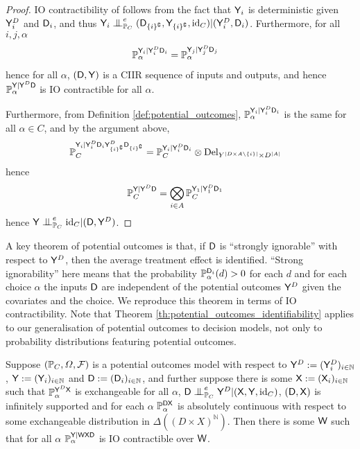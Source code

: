 \begin{proof}
IO contractibility of  follows from the fact that $\mathsf{Y}_i$ is deterministic given $\mathsf{Y}^D_i$ and $\mathsf{D}_i$, and thus $\RV{Y}_i\CI^e_{\prob{P}_C} (\RV{D}_{\{i\}^{\complement}},\RV{Y}_{\{i\}^{\complement}},\text{id}_C)|(\RV{Y}^D_{i},\RV{D}_i)$. Furthermore, for all $i,j,\alpha$
\begin{align}
    \mathbb{P}_\alpha^{\mathsf{Y}_i|\mathsf{Y}^D_i\mathsf{D}_i} &= \mathbb{P}_\alpha^{\mathsf{Y}_j|\mathsf{Y}^D_j\mathsf{D}_j}
\end{align}
hence for all $\alpha$, $(\mathsf{D},\mathsf{Y})$ is a CIIR sequence of inputs and outputs, and hence $\mathbb{P}_\alpha^{\mathsf{Y}|\mathsf{Y}^D\mathsf{D}}$ is IO contractible for all $\alpha$.

Furthermore, from Definition \ref{def:potential_outcomes}, $\mathbb{P}_\alpha^{\mathsf{Y}_i|\mathsf{Y}^D_i\mathsf{D}_i}$ is the same for all $\alpha\in C$, and by the argument above,
\begin{align}
    \mathbb{P}_C^{\mathsf{Y}_i|\mathsf{Y}^D_i\mathsf{D}_i\mathsf{Y}^D_{\{i\}^{\complement}}\mathsf{D}_{\{i\}^{\complement}}} &= \mathbb{P}_C^{\mathsf{Y}_i|\mathsf{Y}^D_i\mathsf{D}_i}\otimes \mathrm{Del}_{Y^{|D\times A\setminus\{i\}|}\times D^{|A|}}
\end{align}
hence
\begin{align}
    \mathbb{P}_C^{\mathsf{Y}|\mathsf{Y}^D\mathsf{D}} &= \bigotimes_{i\in A} \mathbb{P}_C^{\mathsf{Y}_1|\mathsf{Y}^D_1\mathsf{D}_1}
\end{align}
hence $\RV{Y}\CI_{\prob{P}_C}^e\text{id}_C|(\RV{D},\RV{Y}^D)$.
\end{proof}

A key theorem of potential outcomes is that, if $\mathsf{D}$ is ``strongly ignorable'' with respect to $\mathsf{Y}^D$, then the average treatment effect is identified. ``Strong ignorability'' here means that the probability $\mathbb{P}_\alpha^{\mathsf{D}_i}(d)>0$ for each $d$ and for each choice $\alpha$ the inputs $\mathsf{D}$ are independent of the potential outcomes $\mathsf{Y}^D$ given the covariates and the choice. We reproduce this theorem in terms of IO contractibility. Note that Theorem \ref{th:potential_outcomes_identifiability} applies to our generalisation of potential outcomes to decision models, not only to probability distributions featuring potential outcomes.

\begin{theorem}\label{th:potential_outcomes_identifiability}
Suppose $(\mathbb{P}_C,\Omega,\mathcal{F})$ is a potential outcomes model with respect to $\mathsf{Y}^D:=(\mathsf{Y}^D_i)_{i\in \mathbb{N}}$, $\mathsf{Y}:=(\mathsf{Y}_i)_{i\in \mathbb{N}}$ and $\mathsf{D}:=(\mathsf{D}_i)_{i\in \mathbb{N}}$, and further suppose there is some $\mathsf{X}:= (\mathsf{X}_i)_{i\in \mathbb{N}}$ such that $\mathbb{P}_\alpha^{\mathsf{Y}^D\mathsf{X}}$ is exchangeable for all $\alpha$, $\RV{D} \CI^e_{\prob{P}_C} \RV{Y}^D | (\RV{X},\RV{Y},\text{id}_C)$, $(\mathsf{D},\mathsf{X})$ is infinitely supported and for each $\alpha$ $\mathbb{P}_\alpha^{\mathsf{DX}}$ is absolutely continuous with respect to some exchangeable distribution in $\Delta((D\times X)^{\mathbb{N}})$. Then there is some $\mathsf{W}$ such that for all $\alpha$ $\mathbb{P}_\alpha^{\mathsf{Y}|\mathsf{WXD}}$ is IO contractible over $\mathsf{W}$.
\end{theorem}

